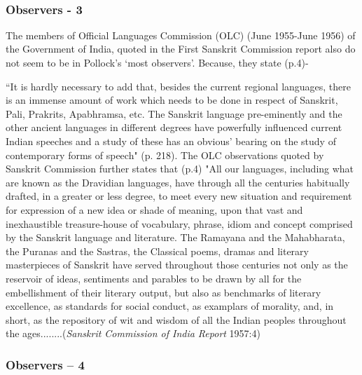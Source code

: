 ~\\[-40pt]

\subsubsection{Observers - 3}
\vskip -5pt

The members of Official Languages Commission (OLC) (June 1955-June 1956) of the Government of India, quoted in the First Sanskrit Commission report also do not seem to be in Pollock’s ‘most observers’. Because, they state (p.4)-
\begin{myquote}
\eleven
``It is hardly necessary to add that, besides the current regional languages, there is an immense amount of work which needs to be done in respect of Sanskrit, Pali, Prakrits, Apabhramsa, etc. The Sanskrit language pre-eminently and the other ancient languages in different degrees have powerfully influenced current Indian speeches and a study of these has an obvious' bearing on the study of contemporary forms of speech" (p. 218). The OLC observations quoted by Sanskrit Commission further states that (p.4) "All our languages, including what are known as the Dravidian languages, have through all the centuries habitually drafted, in a greater or less degree, to meet every new situation and requirement for expression of a new idea or shade of meaning, upon that vast and inexhaustible treasure-house of vocabulary, phrase, idiom and concept comprised by the Sanskrit language and literature. The Ramayana and the Mahabharata, the Puranas and the Sastras, the Classical poems, dramas and literary masterpieces of Sanskrit have served throughout those centuries not only as the reservoir of ideas, sentiments and parables to be drawn by all for the embellishment of their literary output, but also as benchmarks of literary excellence, as standards for social conduct, as examplars of morality, and, in short, as the repository of wit and wisdom of all the Indian peoples throughout the ages........\hfill ({\sl Sanskrit Commission of India Report} 1957:4)
\end{myquote}

\subsubsection{Observers – 4}

